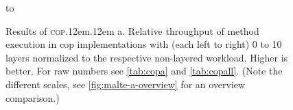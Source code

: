 \documentclass[preprint,english,10pt,nonatbib]{sigplanconf}
\DeclareRobustCommand*\copa{\textsc{cop}\kern .12em\oldstylenums{09}\kern .12em a\xspace}
\begin{document}
\begin{figure}
  \centering
  \hbox to 
\caption{Results of \copa. Relative throughput of method execution in
  \protect\acs{cop} implementations with (each left to right) 0 to 10 layers
  normalized to the respective non-layered workload. Higher is better. For raw
  numbers see \autoref{tab:copa} and \autoref{tab:copall}. (Note
  the different scales, see \autoref{fig:malte-a-overview} for an overview
  comparison.)}
  \label{fig:malte-a}
\end{figure}
\end{document}
